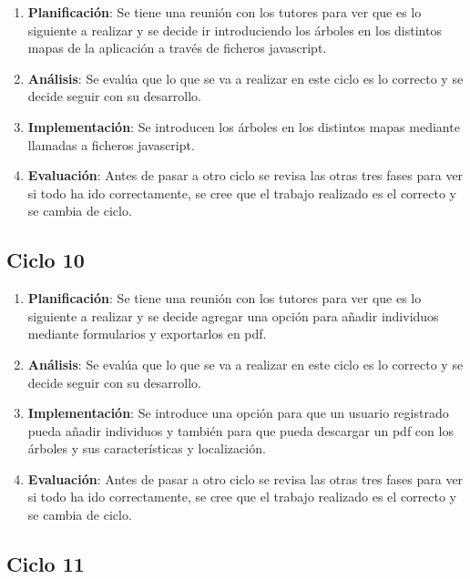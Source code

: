 \begin{enumerate}
	\item \textbf{Planificación}: Se tiene una reunión con los tutores para ver que es lo siguiente a realizar y se decide ir introduciendo los árboles en los distintos mapas de la aplicación a través de ficheros javascript.
	\item \textbf{Análisis}: Se evalúa que lo que se va a realizar en este ciclo es lo correcto y se decide seguir con su desarrollo.
	\item \textbf{Implementación}: Se introducen los árboles en los distintos mapas mediante llamadas a ficheros javascript.
	\item \textbf{Evaluación}: Antes de pasar a otro ciclo se revisa las otras tres fases para ver si todo ha ido correctamente, se cree que el trabajo realizado es el correcto y se cambia de ciclo.
\end{enumerate}

\subsection{Ciclo 10}

\begin{enumerate}
	\item \textbf{Planificación}: Se tiene una reunión con los tutores para ver que es lo siguiente a realizar y se decide agregar una opción para añadir individuos mediante formularios y exportarlos en pdf.
	\item \textbf{Análisis}: Se evalúa que lo que se va a realizar en este ciclo es lo correcto y se decide seguir con su desarrollo.
	\item \textbf{Implementación}: Se introduce una opción para que un usuario registrado pueda añadir individuos y también para que pueda descargar un pdf con los árboles y sus características y localización.
	\item \textbf{Evaluación}: Antes de pasar a otro ciclo se revisa las otras tres fases para ver si todo ha ido correctamente, se cree que el trabajo realizado es el correcto y se cambia de ciclo.
\end{enumerate}

\subsection{Ciclo 11}

